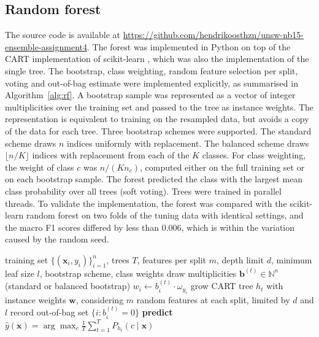 \documentclass[conference,10pt]{IEEEtran}
\begin{document}
\subsection{Random forest}
The source code is available at \url{https://github.com/hendrikoosthzn/unsw-nb15-ensemble-assignment4}. The forest was implemented in Python on top of the CART implementation of scikit-learn \cite{pedregosa2011scikit}, which was also the implementation of the single tree. The bootstrap, class weighting, random feature selection per split, voting and out-of-bag estimate were implemented explicitly, as summarised in Algorithm~\ref{alg:rf}. A bootstrap sample was represented as a vector of integer multiplicities over the training set and passed to the tree as instance weights. The representation is equivalent to training on the resampled data, but avoids a copy of the data for each tree. Three bootstrap schemes were supported. The standard scheme draws $n$ indices uniformly with replacement. The balanced scheme draws $\lfloor n/K\rfloor$ indices with replacement from each of the $K$ classes. For class weighting, the weight of class $c$ was $n/(K n_c)$, computed either on the full training set or on each bootstrap sample. The forest predicted the class with the largest mean class probability over all trees (soft voting). Trees were trained in parallel threads. To validate the implementation, the forest was compared with the scikit-learn random forest on two folds of the tuning data with identical settings, and the macro F1 scores differed by less than 0.006, which is within the variation caused by the random seed.

\begin{algorithm}[t]
\caption{Random forest training and prediction}\label{alg:rf}
\begin{algorithmic}[1]
\Require training set $\{(\mathbf{x}_i,y_i)\}_{i=1}^n$, trees $T$, features per split $m$, depth limit $d$, minimum leaf size $l$, bootstrap scheme, class weights
\State draw multiplicities $\mathbf{b}^{(t)}\in\mathbb{N}^n$ (standard or balanced bootstrap)
\State $w_i \gets b_i^{(t)}\cdot \omega_{y_i}$ 
\State grow CART tree $h_t$ with instance weights $\mathbf{w}$, considering $m$ random features at each split, limited by $d$ and $l$
\State record out-of-bag set $\{i : b_i^{(t)}=0\}$
\EndFor
\State \textbf{predict} $\hat{y}(\mathbf{x})=\arg\max_c \frac{1}{T}\sum_{t=1}^T P_{h_t}(c\mid\mathbf{x})$
\end{algorithmic}
\end{algorithm}
\end{document}
